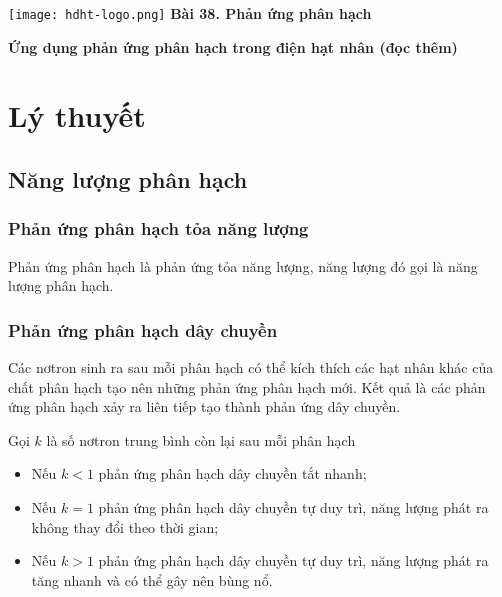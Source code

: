 \newcommand{\chapter}[2][]{
	\newcommand{\chapname}{#2}
	\begin{flushleft}
		\begin{minipage}[t]{\linewidth}
			\texttt{[image: hdht-logo.png]}
			\hspace{0pt}	
			\sffamily\bfseries\large Bài  38. Phản ứng phân hạch
			\begin{flushleft}
				\huge\bfseries #1
			\end{flushleft}
		\end{minipage}
	\end{flushleft}
	\vspace{1cm}
	\normalfont\normalsize
}
\chapter[Ứng dụng phản ứng phân hạch trong điện hạt nhân (đọc thêm)]{Ứng dụng phản ứng phân hạch trong điện hạt nhân\\ (đọc thêm)}
\section{Lý thuyết}

\subsection{Năng lượng phân hạch}
	\subsubsection{Phản ứng phân hạch tỏa năng lượng}
	Phản ứng phân hạch là phản ứng tỏa năng lượng, năng lượng đó gọi là năng lượng phân hạch.
	\subsubsection{Phản ứng phân hạch dây chuyền}
	Các nơtron sinh ra sau mỗi phân hạch có thể kích thích các hạt nhân khác của chất phân hạch tạo nên những phản ứng phân hạch mới. Kết quả là các phản ứng phân hạch xảy ra liên tiếp tạo thành phản ứng dây chuyền.
	
	Gọi $k$ là số nơtron trung bình còn lại sau mỗi phân hạch
	\begin{itemize}
		\item Nếu $k < 1$ phản ứng phân hạch dây chuyền tắt nhanh;
		\item Nếu $k = 1$ phản ứng phân hạch dây chuyền tự duy trì, năng lượng phát ra không thay đổi theo thời gian;
		\item Nếu $k > 1$ phản ứng phân hạch dây chuyền tự duy trì, năng lượng phát ra tăng nhanh và có thể gây nên bùng nổ.
	\end{itemize}
	
